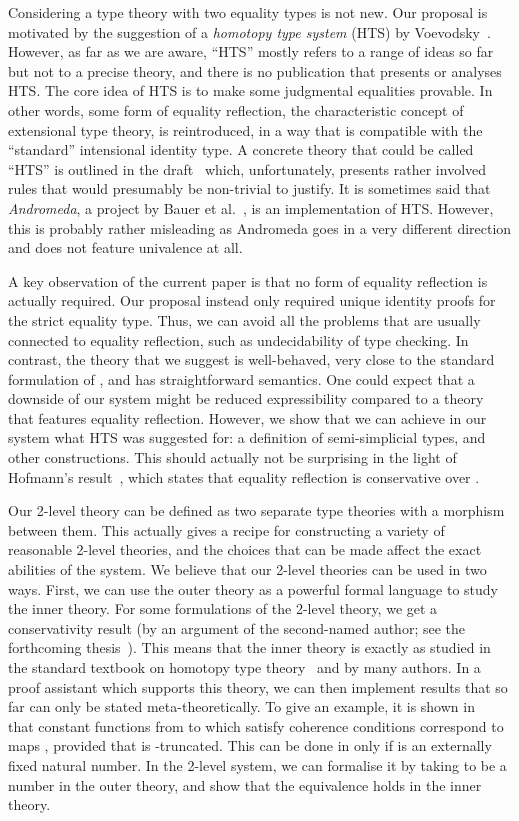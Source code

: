 \documentclass[a4paper,reqno]{amsart}
\theoremstyle{plain}
\theoremstyle{definition}
\begin{document}
Considering a type theory with two equality types is not new.
Our proposal is motivated by the suggestion of 
a \emph{homotopy type system} (HTS) by Voevodsky~\cite{voe_hts}.
However, as far as we are aware, ``HTS'' mostly refers to a range of ideas so far 
but not to a precise theory, and there is no publication that presents or analyses HTS.
The core idea of HTS is to make some judgmental equalities provable.
In other words, some form of equality reflection, the characteristic concept of extensional type theory, is reintroduced, in a way that is compatible with the ``standard'' intensional identity type.
A concrete theory that could be called ``HTS'' is outlined in the draft~\cite{voe_hts} which, unfortunately, presents rather involved rules that would presumably be non-trivial to justify.
It is sometimes said that \emph{Andromeda}, a project by Bauer et al.~\cite{andromeda}, is an implementation of HTS.
However, this is probably rather misleading as Andromeda goes in a very different direction and does not feature univalence at all.


A key observation of the current paper is that no form of equality reflection is actually required.
Our proposal instead only required unique identity proofs for the strict equality type.
Thus, we can avoid all the problems that are usually connected to equality reflection, such as undecidability of type checking.
In contrast, the theory that we suggest is well-behaved, very close to the standard formulation of , and has straightforward semantics.
One could expect that a downside of our system might be reduced expressibility compared to a theory that features equality reflection. 
However, we show that we can achieve in our system what HTS was suggested for: a definition of semi-simplicial types, and other constructions.
This should actually not be surprising in the light of Hofmann's result~\cite{hofmann_conservativity}, which states that equality reflection is conservative over .

Our 2-level theory can be defined as two separate type theories with a morphism between them. 
This actually gives a recipe for constructing a variety of reasonable 2-level theories, and the choices that can be made affect the exact abilities of the system.
We believe that our 2-level theories can be used in two ways.
First, we can use the outer theory as a powerful formal language to study the inner theory.
For some formulations of the 2-level theory, we get a conservativity result (by an argument of the second-named author; see the forthcoming thesis~\cite{paolo:thesis}).
This means that the inner theory is exactly  as studied in the standard textbook on homotopy type theory~\cite{HoTTbook} and by many authors.
In a proof assistant which supports this theory, we can then implement results that so far can only be stated meta-theoretically.
To give an example, it is shown in~\cite{kraus_generaluniversalproperty} that constant functions from  to  which satisfy  coherence conditions correspond to maps , provided that  is -truncated. 
This can be done in  only if  is an externally fixed natural number.
In the 2-level system, we can formalise it by taking  to be a number in the outer theory, and show that the equivalence holds in the inner theory.
\end{document}
